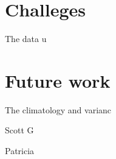 \documentclass[twocol]{ametsoc}
\begin{document}
\section{Challeges}
The data u

\section{Future work}
The climatology and varianc


\acknowledgments{}

Scott G

Patricia

%
%
%






\end{document}
